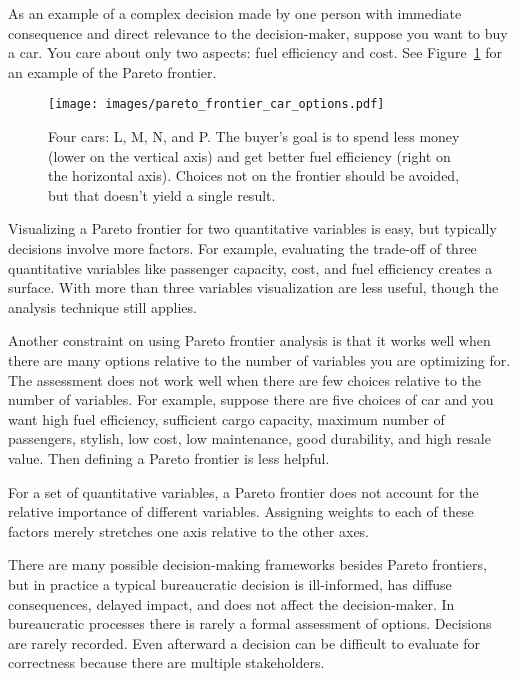 As an example of a complex decision made by one person with immediate consequence and direct relevance to the decision-maker, suppose you want to buy a car. You care about only two aspects: fuel efficiency and cost. See Figure~\ref{fig:pareto_frontier_cars} for an example of the Pareto frontier.

\begin{figure}[ht]
    \centering
    \texttt{[image: images/pareto\_frontier\_car\_options.pdf]}
    \caption{Four cars: L, M, N, and P. The buyer's goal is to spend less money (lower on the vertical axis) and get better fuel efficiency (right on the horizontal axis). Choices not on the frontier should be avoided, but that doesn't yield a single result.}
    \label{fig:pareto_frontier_cars}
\end{figure}

Visualizing a Pareto frontier for two quantitative variables is easy, but typically decisions involve more factors. For example, evaluating the trade-off of three quantitative variables like 
passenger capacity, cost, and fuel efficiency creates a surface. With more than three variables visualization are less useful, though the analysis technique still applies. 

Another constraint on using Pareto frontier analysis is that it works well when there are many options relative to the number of variables you are optimizing for. 
The assessment does not work well when there are few choices relative to the number of variables. For example, suppose there are five choices of car and you want high fuel efficiency, sufficient cargo capacity, maximum number of passengers, stylish, low cost, low maintenance, good durability, and high resale value. Then defining a Pareto frontier is less helpful.

For a set of quantitative variables, a Pareto frontier does not account for the relative importance of different variables. Assigning weights to each of these factors merely stretches one axis relative to the other axes. 

There are many possible decision-making frameworks besides Pareto frontiers, but in practice a typical bureaucratic decision is ill-informed, has diffuse consequences, delayed impact, and does not affect the decision-maker. In bureaucratic processes there is rarely a formal assessment of options. 
Decisions are rarely recorded. 
Even afterward a decision can be difficult to evaluate for correctness because there are multiple stakeholders.

